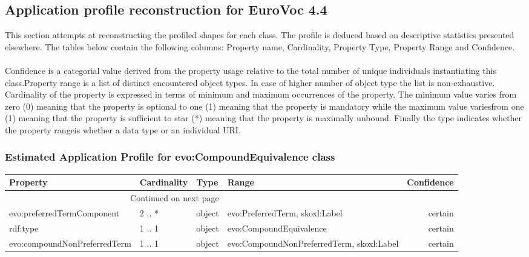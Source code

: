\documentclass[10pt,a4paper,titlepage,final]{article}
\begin{document}
\subsection{Application profile reconstruction for EuroVoc 4.4}
This section attempts at reconstructing the profiled shapes for each class. The profile is deduced based on descriptive statistics presented elsewhere. The tables below contain the following columns: Property name, Cardinality, Property Type, Property Range and Confidence. \\\\ Confidence is a categorial value derived from the property usage relative to the total number of unique individuals instantiating this class.Property range is a list of distinct encountered object types. In case of higher number of object type the list is non{-}exhaustive. Cardinality of the property is expressed in terms of minimum and maximum occurrences of the property. The minimum value varies from zero (0) meaning that the property is optional to one (1) meaning that the property is mandatory while the maximum value variesfrom one (1) meaning that the property is sufficient to star (*) meaning that the property is maximally unbound. Finally the type indicates whether the property rangeis whether a data type or an individual URI.
\subsubsection{Estimated Application Profile for evo:CompoundEquivalence class}
\begin{tabularx}{\textwidth}{lllXr}
\toprule
                     Property & Cardinality &    Type &                                      Range & Confidence \\
\midrule
\endhead
\midrule
\multicolumn{3}{r}{{Continued on next page}} \\
\midrule
\endfoot

\bottomrule
\endlastfoot
   evo:preferredTermComponent &      2 .. * &  object &             evo:PreferredTerm, skoxl:Label &    certain \\
                     rdf:type &      1 .. 1 &  object &                    evo:CompoundEquivalence &    certain \\
 evo:compoundNonPreferredTerm &      1 .. 1 &  object &  evo:CompoundNonPreferredTerm, skoxl:Label &    certain \\
\end{tabularx}
\end{document}
